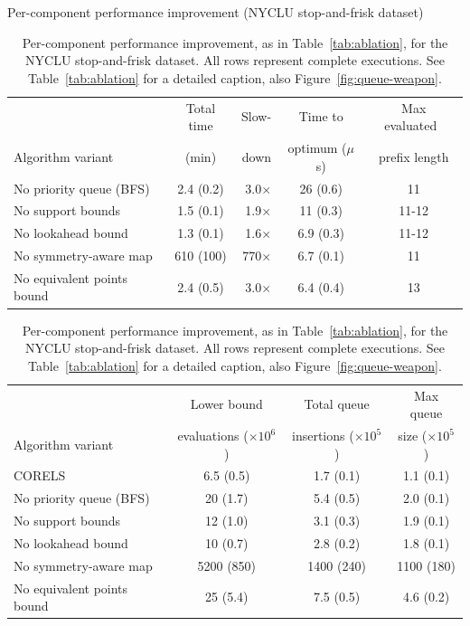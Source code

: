 \begin{table}[t!]
\begin{centering}
Per-component performance improvement (NYCLU stop-and-frisk dataset) \\
\end{centering}
\vspace{1mm}
\begin{tabular}{l | c  r | c | c}
& Total time & Slow- & Time to & Max evaluated~ \\
Algorithm variant & (min) & down & optimum ($\mu$s) & prefix length \\
\hline
No priority queue (BFS) & 2.4 (0.2) & 3.0$\times$ & 26 (0.6) & 11 \\
No support bounds & 1.5 (0.1) & 1.9$\times$ & 11 (0.3) & 11-12 \\
No lookahead bound & 1.3 (0.1) & 1.6$\times$ & 6.9 (0.3) & 11-12 \\
No symmetry-aware map & 610 (100) & 770$\times$ & 6.7 (0.1) & 11 \\
No equivalent points bound & 2.4 (0.5) & 3.0$\times$ & 6.4 (0.4) & 13 \\
\hline
\end{tabular}
\begin{tabular}{l | c | c | c}
\hline
 & Lower bound & Total queue &  Max queue \\
Algorithm variant & evaluations ($\times 10^6$) & insertions ($\times 10^5$) & size ($\times 10^5$) \\
\hline
CORELS & 6.5 (0.5) & 1.7 (0.1) & 1.1 (0.1) \\
No priority queue (BFS) & 20 (1.7) & 5.4 (0.5) & 2.0 (0.1) \\
No support bounds & 12 (1.0) & 3.1 (0.3) & 1.9 (0.1) \\
No lookahead bound & 10 (0.7) & 2.8 (0.2) & 1.8 (0.1) \\
No symmetry-aware map & 5200 (850) & 1400 (240) & 1100 (180) \\
No equivalent points bound & 25 (5.4) & 7.5 (0.5) & 4.6 (0.2) \\
\end{tabular}
\caption{Per-component performance improvement, as in Table~\ref{tab:ablation},
for the NYCLU stop-and-frisk dataset.
%
All rows represent complete executions.
%
See Table~\ref{tab:ablation} for a detailed caption,
also Figure~\ref{fig:queue-weapon}.
}
\vspace{4mm}
\label{tab:ablation-weapon}
\end{table}

